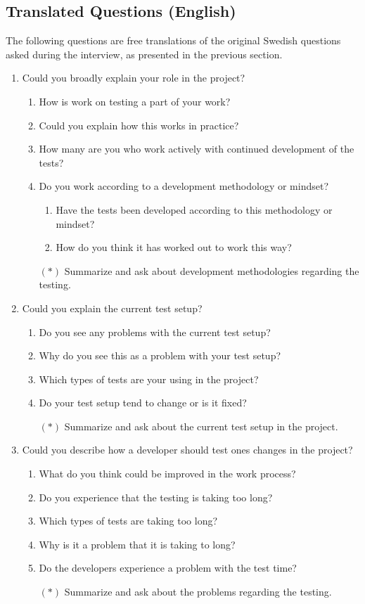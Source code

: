 \tocless\subsection{Translated Questions (English)}
The following questions are free translations of the original Swedish questions asked during the interview, as presented in the previous section.

\vspace{1ex}
\begin{enumerate}
  \item Could you broadly explain your role in the project?
  \begin{enumerate}
    \item How is work on testing a part of your work?
    \item Could you explain how this works in practice?
    \item How many are you who work actively with continued development of the tests?
    \item Do you work according to a development methodology or mindset?
    \begin{enumerate}
      \item Have the tests been developed according to this methodology or mindset?
      \item How do you think it has worked out to work this way?
    \end{enumerate}
    \item[$(*)$] Summarize and ask about development methodologies regarding the testing.
  \end{enumerate}
  
  \item Could you explain the current test setup?
  \begin{enumerate}
    \item Do you see any problems with the current test setup?
    \item Why do you see this as a problem with your test setup?
    \item Which types of tests are your using in the project?
    \item Do your test setup tend to change or is it fixed?
    \item[$(*)$] Summarize and ask about the current test setup in the project.
  \end{enumerate}
  
  \item Could you describe how a developer should test ones changes in the project?
  \begin{enumerate}
    \item What do you think could be improved in the work process?
    \item Do you experience that the testing is taking too long?
    \item Which types of tests are taking too long?
    \item Why is it a problem that it is taking to long?
    \item Do the developers experience a problem with the test time?
    \item[$(*)$] Summarize and ask about the problems regarding the testing.
  \end{enumerate}
  

\end{enumerate}
